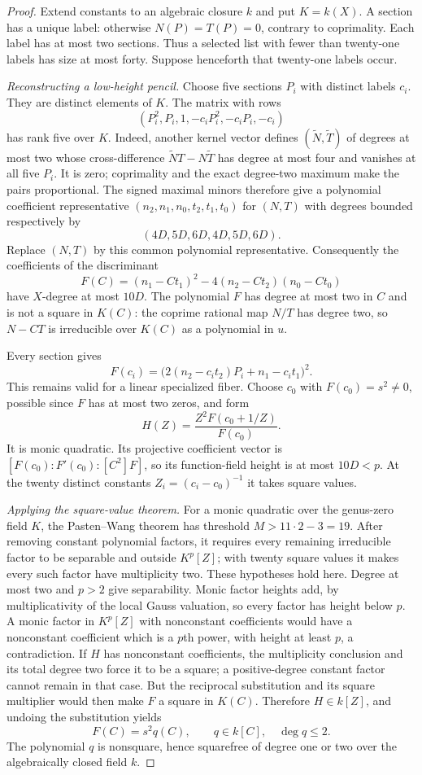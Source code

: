 \begin{proof}
Extend constants to an algebraic closure $k$ and put $K=k(X)$.
A section has a unique label: otherwise $N(P)=T(P)=0$, contrary
to coprimality.  Each label has at most two sections.  Thus a
selected list with fewer than twenty-one labels has size at most
forty.  Suppose henceforth that twenty-one labels occur.

\emph{Reconstructing a low-height pencil.}
Choose five sections $P_i$ with distinct labels $c_i$.  They are
distinct elements of $K$.  The matrix with rows
\[
 (P_i^2,P_i,1,-c_iP_i^2,-c_iP_i,-c_i)
\]
has rank five over $K$.  Indeed, another kernel vector defines
$(\widetilde N,\widetilde T)$ of degrees at most two whose
cross-difference $\widetilde NT-N\widetilde T$ has degree at most
four and vanishes at all five $P_i$.  It is zero; coprimality and
the exact degree-two maximum make the pairs proportional.
The signed maximal minors therefore give a polynomial coefficient
representative $(n_2,n_1,n_0,t_2,t_1,t_0)$ for $(N,T)$ with degrees
bounded respectively by
\[
 (4D,5D,6D,4D,5D,6D).
\]
Replace $(N,T)$ by this common polynomial representative.
Consequently the coefficients of the discriminant
\[
 F(C)=(n_1-Ct_1)^2-4(n_2-Ct_2)(n_0-Ct_0)
\]
have $X$-degree at most $10D$.  The polynomial $F$ has degree at
most two in $C$ and is not a square in $K(C)$: the coprime
rational map $N/T$ has degree two, so $N-CT$ is irreducible over
$K(C)$ as a polynomial in $u$.

Every section gives
\[
 F(c_i)=\bigl(2(n_2-c_it_2)P_i+n_1-c_it_1\bigr)^2.
\]
This remains valid for a linear specialized fiber.  Choose $c_0$
with $F(c_0)=s^2\ne0$, possible since $F$ has at most two zeros,
and form
\[
 H(Z)=\frac{Z^2F(c_0+1/Z)}{F(c_0)}.
\]
It is monic quadratic.  Its projective coefficient vector is
$[F(c_0):F'(c_0):[C^2]F]$, so its function-field height is at most
$10D<p$.  At the twenty distinct constants
$Z_i=(c_i-c_0)^{-1}$ it takes square values.

\emph{Applying the square-value theorem.}
For a monic quadratic over the genus-zero field $K$, the
Pasten--Wang theorem has threshold $M>11\cdot2-3=19$.
After removing constant polynomial factors, it requires every
remaining irreducible factor to be separable and outside $K^p[Z]$;
with twenty square values it makes every such factor have
multiplicity two.  These hypotheses hold here.  Degree at most
two and $p>2$ give separability.  Monic factor heights add, by
multiplicativity of the local Gauss valuation, so every factor
has height below $p$.  A monic factor in $K^p[Z]$ with nonconstant coefficients
would have a nonconstant coefficient which is a $p$th power,
with height at least $p$, a contradiction.
If $H$ has nonconstant coefficients, the multiplicity conclusion
and its total degree two force it to be a square; a positive-degree
constant factor cannot remain in that case.  But the reciprocal
substitution and its square multiplier would then make $F$ a
square in $K(C)$.  Therefore $H\in k[Z]$, and undoing the
substitution yields
\[
 F(C)=s^2q(C),\qquad q\in k[C],\quad \deg q\le2.
\]
The polynomial $q$ is nonsquare, hence squarefree of degree one or
two over the algebraically closed field $k$.


\end{proof}
